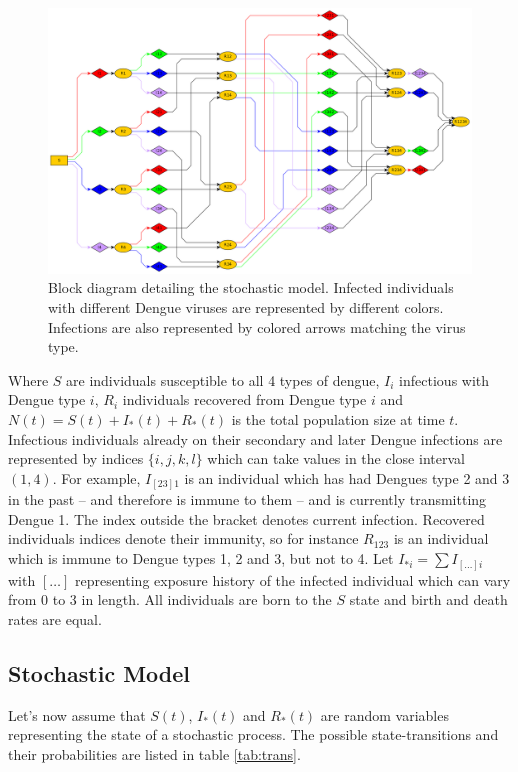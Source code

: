 \documentclass[12pt]{article}
\begin{document}
          \begin{figure}
 \centering
 \includegraphics[width=16cm]{Dengue4.png}

 \caption{Block diagram detailing the stochastic model. Infected individuals 
with different Dengue viruses are represented by different colors. Infections 
are also represented by colored arrows matching the virus type.}
 \label{fig:sde_blocks}
\end{figure}


Where $S$ are individuals susceptible to all 4 types of dengue, $I_i$ 
infectious 
with Dengue type $i$, $R_i$ individuals recovered from Dengue type $i$ and 
$N(t) = S(t) + I_*(t) + R_*(t)$ is the total population size at time $t$. 
Infectious individuals already on their secondary and later Dengue infections 
are represented by indices $\{i,j,k,l\}$ which can take values in the close 
interval $(1,4)$. For example, $I_{[23]1}$ is an individual 
which has had Dengues type 2 and 3 in the past -- and therefore is immune to 
them -- and is currently transmitting Dengue 1. 
The index outside the bracket 
denotes current infection. Recovered individuals indices denote their immunity, 
so for instance $R_{123}$ is an individual which is immune to Dengue types 1, 2 
and 3, but not to 4. Let $I_{*i} = \sum I_{[\ldots]i}$ with $[\ldots]$ 
representing exposure history of the infected individual which can vary from 0 
to 3 in length. 
All individuals are born to the $S$ state and birth and death 
rates are equal.

\subsection*{Stochastic Model}
Let's now assume that $S(t)$, $I_*(t)$ and $R_*(t)$ are random variables 
representing the state of a stochastic process.
The possible state-transitions and their  probabilities are listed in table 
\ref{tab:trans}.
\end{document}
